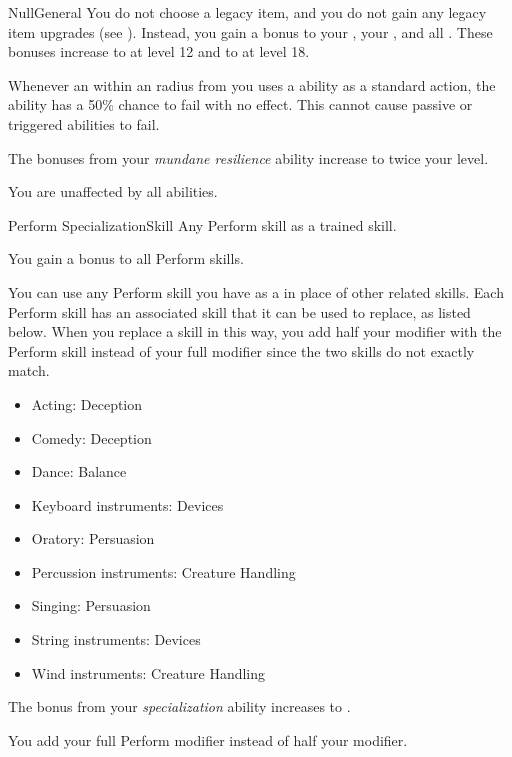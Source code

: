 \begin{feat}{Null}{General}
     You do not choose a legacy item, and you do not gain any legacy item upgrades (see ).
    Instead, you gain a  bonus to your , your , and all .
    These bonuses increase to  at level 12 and to  at level 18.

     Whenever an  within an \medarea radius from you uses a \magical ability as a standard action, the ability has a 50\% chance to fail with no effect.
    This cannot cause passive or triggered abilities to fail.

     The bonuses from your \textit{mundane resilience} ability increase to twice your level.

     You are unaffected by all \magical abilities.
  \end{feat}

  \begin{feat}{Perform Specialization}{Skill}
    \featpre Any Perform skill as a trained skill.

     You gain a  bonus to all Perform skills.

     You can use any Perform skill you have as a  in place of other related skills.
    Each Perform skill has an associated skill that it can be used to replace, as listed below.
    When you replace a skill in this way, you add half your modifier with the Perform skill instead of your full modifier since the two skills do not exactly match.
    \begin{itemize}
      \item Acting: Deception
      \item Comedy: Deception
      \item Dance: Balance
      \item Keyboard instruments: Devices
      \item Oratory: Persuasion
      \item Percussion instruments: Creature Handling
      \item Singing: Persuasion
      \item String instruments: Devices
      \item Wind instruments: Creature Handling
    \end{itemize}

     The bonus from your \textit{specialization} ability increases to .

     You add your full Perform modifier instead of half your modifier.
  \end{feat}

